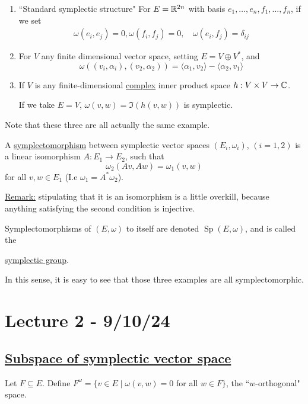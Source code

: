 \documentclass[x11names,reqno,14pt]{extarticle}
\DeclareMathOperator{\Sp}{Sp}
\begin{document}
\begin{enumerate}

\item ``Standard symplectic structure" For $E = \mathbb{R}^{2n}$ with basis $e_1, \dots, e_n, f_1, \dots, f_n$, if we set 
\begin{align*}
\omega(e_i,e_j) = 0,\omega(f_i,f_j)=0,\,&\omega(e_i,f_j)=\delta_{ij}
\end{align*}

\item For $V$ any finite dimensional vector space, setting $E = V \oplus V^*$, and 
\[
\omega((v_i,\alpha_i),(v_2,\alpha_2)) = \langle\alpha_1,v_2\rangle - \langle \alpha_2,v_1\rangle
\]

\item If $V$ is any finite-dimensional \underline{complex} inner product space $h:V\times V \to \mathbb{C}$. 

If we take $E = V$, $\omega(v, w) = \Im(h(v, w))$ is symplectic.

\end{enumerate}

Note that these three are all actually the same example. 


A \underline{symplectomorphism} between symplectic vector spaces $(E_i, \omega_i)$, $(i = 1, 2)$ is a linear isomorphism $A: E_1\to E_2$, such that
\[
\omega_2(Av,Aw) = \omega_1(v,w)
\]
for all $v, w \in E_1$ (I.e $\omega_1 = A^*\omega_2$).

\underline{Remark:} stipulating that it is an isomorphism is a little overkill, because anything satisfying the second condition is injective. 

Symplectomorphisms of $(E,\omega)$ to itself are denoted $\Sp(E,\omega)$, and is called the 

\underline{symplectic group}.

In this sense, it is easy to see that those three examples are all symplectomorphic. 


\section*{Lecture 2 - 9/10/24}

\subsection*{\underline{Subspace of symplectic vector space}}

Let $F \subseteq E$. Define $F^\omega = \{v\in E \mid \omega(v, w) = 0$ for all $w \in F\}$, the ``$w$-orthogonal" space. 
\end{document}
